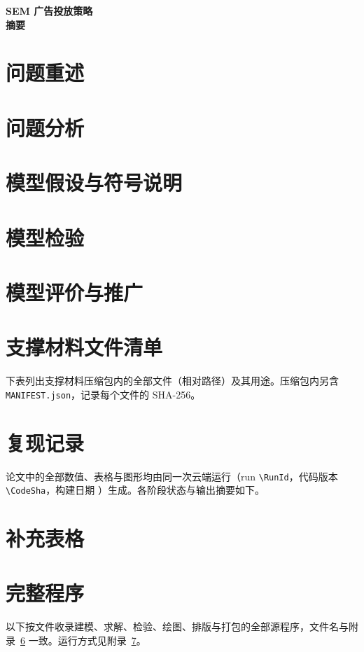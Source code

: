\documentclass[UTF8,zihao=-4,fontset=none,a4paper]{ctexart}
\theoremstyle{definition}
\begin{document}
\setcounter{page}{1}
\begin{center}
{\LARGE\bfseries\sffamily\color{ink} SEM 广告投放策略}\\[10pt]
{\large\bfseries 摘\quad 要}
\end{center}

\label{page:abstract-end}
\newpage

\section{问题重述}


\section{问题分析}


\section{模型假设与符号说明}




\section{模型检验}
\label{sec:validation}


\section{模型评价与推广}




\begingroup
\linespread{1.1}\small
\makeatletter{}\makeatother
{}

\endgroup
\label{page:body-end}

\clearpage
\appendix
\section{支撑材料文件清单}
\label{app:support}
下表列出支撑材料压缩包内的全部文件（相对路径）及其用途。压缩包内另含 \nolinkurl{MANIFEST.json}，记录每个文件的 SHA-256。


\section{复现记录}
\label{app:repro}
论文中的全部数值、表格与图形均由同一次云端运行（run \nolinkurl{\RunId}，代码版本 \nolinkurl{\CodeSha}，构建日期 \BuildDate）生成。各阶段状态与输出摘要如下。



\section{补充表格}
\label{app:tables}


\section{完整程序}
\label{app:code}
以下按文件收录建模、求解、检验、绘图、排版与打包的全部源程序，文件名与附录~\ref{app:support} 一致。运行方式见附录~\ref{app:repro}。

\end{document}
